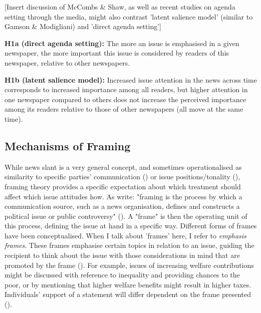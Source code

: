 \documentclass{article}
\begin{document}
[Insert discussion of McCombs \& Shaw, as well as recent studies on agenda setting through the media, might also contrast 'latent salience model' (similar to Gamson \& Modigliani) and 'direct agenda setting']

\medskip

\textbf{H1a (direct agenda setting):} The more an issue is emphasised in a given newspaper, the more important this issue is considered by readers of this newspaper, relative to other newspapers.

\textbf{H1b (latent salience model):} Increased issue attention in the news across time corresponds to increased importance among all readers, but higher attention in one newspaper compared to others does not increase the perceived importance among its readers relative to those of other newspapers (all move at the same time).

\subsection{Mechanisms of Framing}

While news slant is a very general concept, and sometimes operationalised as similarity to specific parties' communication (\cite{Gentzkow2010}) or issue positions/tonality (\cite{Spirig2020}), framing theory provides a specific expectation about which treatment should affect which issue attitudes how. As \citeauthor{Nelson1997} write: "framing is the process by which a communication source, such as a news organisation, defines and constructs a political issue or public controversy" (\citeyear[567]{Nelson1997}). A "frame" is then the operating unit of this process, defining the issue at hand in a specific way. Different forms of frames have been conceptualised. When I talk about 'frames' here, I refer to \textit{emphasis frames}. These frames emphasise certain topics in relation to an issue, guiding the recipient to think about the issue with those considerations in mind that are promoted by the frame (\cite[153f]{Leeper2020}). For example, issues of increasing welfare contributions might be discussed with reference to inequality and providing chances to the poor, or by mentioning that higher welfare benefits might result in higher taxes. Individuals' support of a statement will differ dependent on the frame presented (\cite{sniderman2004structure}).
\end{document}
